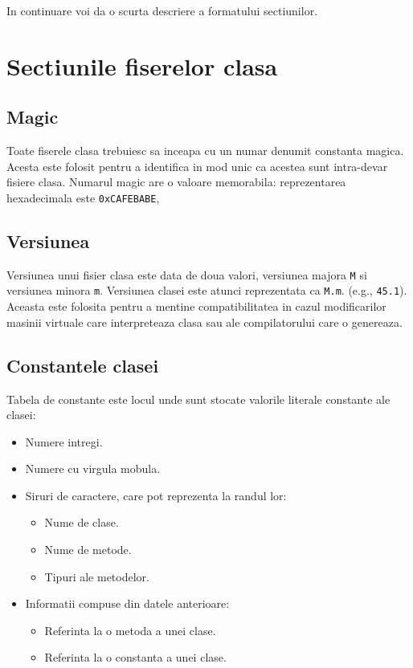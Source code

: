 In continuare voi da o scurta descriere a formatului sectiunilor.

\section{Sectiunile fiserelor clasa}

\subsection{Magic}

Toate fiserele clasa trebuiesc sa inceapa cu un numar denumit constanta
magica. Acesta este folosit pentru a identifica in mod unic ca acestea
sunt intra-devar fisiere clasa. Numarul magic are o valoare memorabila:
reprezentarea hexadecimala este \texttt{0xCAFEBABE},

\subsection{Versiunea}

Versiunea unui fisier clasa este data de doua valori, versiunea majora
\texttt{M} si versiunea minora \texttt{m}. Versiunea clasei este atunci
reprezentata ca \texttt{M.m}. (e.g., \texttt{45.1}). Aceasta este
folosita pentru a mentine compatibilitatea in cazul modificarilor
masinii virtuale care interpreteaza clasa sau ale compilatorului care o
genereaza.

\subsection{Constantele clasei}

Tabela de constante este locul unde sunt stocate valorile literale
constante ale clasei:

\begin{itemize}
	\item Numere intregi.
	\item Numere cu virgula mobula.
	\item Siruri de caractere, care pot reprezenta la randul lor:
	      \begin{itemize}
		      \item Nume de clase.
		      \item Nume de metode.
		      \item Tipuri ale metodelor.
	      \end{itemize}
	\item Informatii compuse din datele anterioare:
	      \begin{itemize}
		      \item Referinta la o metoda a unei clase.
		      \item Referinta la o constanta a unei clase.
	      \end{itemize}
\end{itemize}

